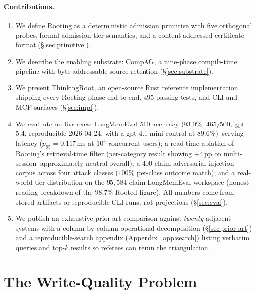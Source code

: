 \documentclass[10pt,a4paper]{article}
\begin{document}
\paragraph{Contributions.}
\begin{sloppypar}
\begin{enumerate}[leftmargin=*,topsep=2pt,itemsep=2pt]
\item We define Rooting as a deterministic admission primitive with
  five orthogonal probes, formal admission-tier semantics, and a
  content-addressed certificate format (\S\ref{sec:primitive}).
\item We describe the enabling substrate: CompAG, a nine-phase
  compile-time pipeline with byte-addressable source retention
  (\S\ref{sec:substrate}).
\item We present ThinkingRoot, an open-source Rust reference
  implementation shipping every Rooting phase end-to-end, $495$
  passing tests, and CLI and MCP surfaces (\S\ref{sec:impl}).
\item We evaluate on five axes: LongMemEval-500 accuracy
  ($\mathbf{93.0\%}$, $465/500$, gpt-5.4, reproducible 2026-04-24, with
  a gpt-4.1-mini control at $89.6\%$); serving latency
  ($p_{95}=0.117$\,ms at $10^{4}$ concurrent users); a read-time
  ablation of Rooting's retrieval-time filter (per-category result
  showing $+4$\,pp on multi-session, approximately neutral overall); a
  $400$-claim adversarial injection corpus across four attack classes
  ($100\%$ per-class outcome match); and a real-world tier
  distribution on the $95{,}584$-claim LongMemEval workspace
  (honest-reading breakdown of the $98.7\%$ Rooted figure). All
  numbers come from stored artifacts or reproducible CLI runs, not
  projections (\S\ref{sec:eval}).
\item We publish an exhaustive prior-art comparison against
  \emph{twenty} adjacent systems with a column-by-column operational
  decomposition (\S\ref{sec:prior-art}) and a reproducible-search
  appendix (Appendix~\ref{app:search}) listing verbatim queries and
  top-$k$ results so referees can rerun the triangulation.
\end{enumerate}
\end{sloppypar}

\section{The Write-Quality Problem}
\label{sec:problem}
\end{document}
